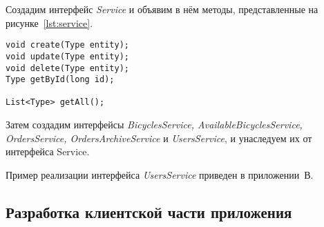 Создадим интерфейс
\textit{Service} и объявим в нём методы, представленные на рисунке~\ref{lst:service}.

\begin{lstlisting}[caption=Объявленные в интерфейсе Service методы,label=lst:service]
void create(Type entity);
void update(Type entity);
void delete(Type entity);
Type getById(long id);

List<Type> getAll();
\end{lstlisting}

Затем создадим интерфейсы \textit{BicyclesService, AvailableBicyclesService,
OrdersService, OrdersArchiveService} и \textit{UsersService}, и унаследуем их от
интерфейса Service.

Пример реализации интерфейса \textit{UsersService} приведен в приложении~В.

\subsection{Разработка клиентской части приложения}


\pagebreak
